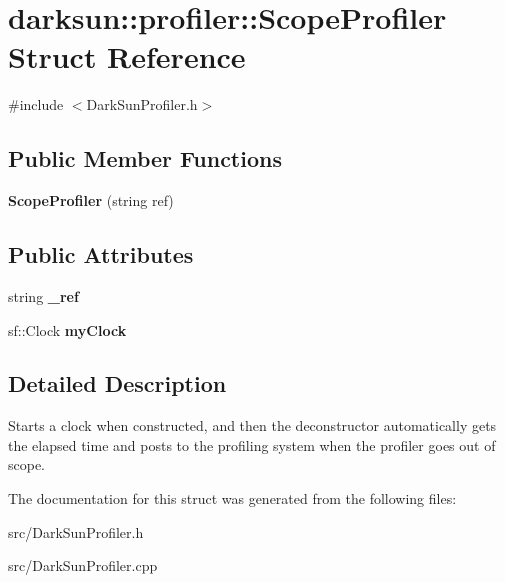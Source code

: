 \hypertarget{structdarksun_1_1profiler_1_1_scope_profiler}{}\section{darksun\+::profiler\+::Scope\+Profiler Struct Reference}
\label{structdarksun_1_1profiler_1_1_scope_profiler}


{\ttfamily \#include $<$Dark\+Sun\+Profiler.\+h$>$}

\subsection*{Public Member Functions}
\begin{DoxyCompactItemize}
\item 
\mbox{\label{structdarksun_1_1profiler_1_1_scope_profiler_a9a68a80ca56e59953593d2369b176e10}} 
{\bfseries Scope\+Profiler} (string ref)
\end{DoxyCompactItemize}
\subsection*{Public Attributes}
\begin{DoxyCompactItemize}
\item 
\mbox{\label{structdarksun_1_1profiler_1_1_scope_profiler_ab19aa2f83c5163ee61323966b15f5bb7}} 
string {\bfseries \+\_\+ref}
\item 
\mbox{\label{structdarksun_1_1profiler_1_1_scope_profiler_a4c1c80999d94c447031127f01772d0db}} 
sf\+::\+Clock {\bfseries my\+Clock}
\end{DoxyCompactItemize}


\subsection{Detailed Description}
Starts a clock when constructed, and then the deconstructor automatically gets the elapsed time and posts to the profiling system when the profiler goes out of scope. 

The documentation for this struct was generated from the following files\+:\begin{DoxyCompactItemize}
\item 
src/Dark\+Sun\+Profiler.\+h\item 
src/Dark\+Sun\+Profiler.\+cpp\end{DoxyCompactItemize}
